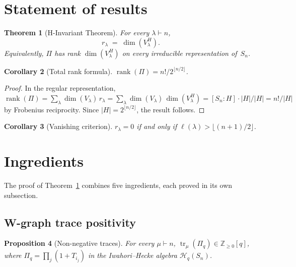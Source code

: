 \documentclass[11pt]{article}
\newtheorem{theorem}{Theorem}
\newtheorem{proposition}[theorem]{Proposition}
\newtheorem{corollary}[theorem]{Corollary}
\theoremstyle{definition}
\theoremstyle{remark}
\DeclareMathOperator{\rank}{rank}
\DeclareMathOperator{\tr}{tr}
\begin{document}
\section{Statement of results}

\begin{theorem}[H-Invariant Theorem]\label{thm:main}
For every $\lambda \vdash n$,
\[
  r_\lambda \;=\; \dim(V_\lambda^H).
\]
Equivalently, $\Pi$ has rank $\dim(V_\lambda^H)$ on every irreducible
representation of~$S_n$.
\end{theorem}

\begin{corollary}[Total rank formula]\label{cor:total}
$\rank(\Pi) = n!/2^{\lfloor n/2 \rfloor}$.
\end{corollary}
\begin{proof}
In the regular representation,
$\rank(\Pi) = \sum_\lambda \dim(V_\lambda)\,r_\lambda
= \sum_\lambda \dim(V_\lambda)\,\dim(V_\lambda^H)
= [S_n : H] \cdot |H| / |H| = n!/|H|$
by Frobenius reciprocity. Since $|H| = 2^{\lfloor n/2 \rfloor}$,
the result follows.
\end{proof}

\begin{corollary}[Vanishing criterion]\label{cor:vanish}
$r_\lambda = 0$ if and only if $\ell(\lambda) > \lfloor(n+1)/2\rfloor$.
\end{corollary}

\section{Ingredients}

The proof of Theorem~\ref{thm:main} combines five ingredients, each
proved in its own subsection.

\subsection{W-graph trace positivity}

\begin{proposition}[Non-negative traces]\label{prop:wgraph}
For every $\mu \vdash n$,
$\tr_\mu(\Pi_q) \in \mathbb{Z}_{\ge 0}[q]$, where
$\Pi_q = \prod_j (1+T_{i_j})$ in the Iwahori--Hecke algebra
$\mathcal{H}_q(S_n)$.
\end{proposition}
\end{document}
